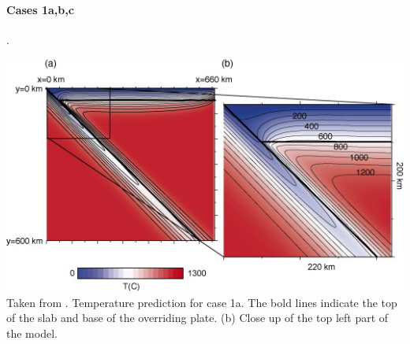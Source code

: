 \paragraph{Cases 1a,b,c}. 

\begin{center}
\includegraphics[width=14cm]{python_codes/fieldstone_68/images/fig2}\\
{\captionfont Taken from \cite{vack08}. Temperature prediction for case 1a. 
The bold lines indicate the top of the slab and base of the overriding plate. 
(b) Close up of the top left part of the model.}
\end{center}


